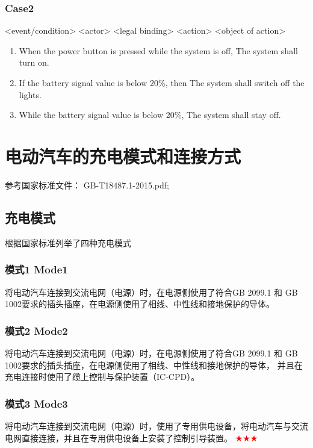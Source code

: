 \subsubsection*{Case2}
	\begin{mybox}
		\centering
		\textcolor{winered}{<event/condition>} \textcolor{mybule}{<actor>} \textcolor{mypurple}{<legal binding>} \textcolor{mygreen1}{<action>} \textcolor{mygreen2}{<object of action>}
	\end{mybox}


	\begin{enumerate}
		\item \textcolor{winered}{When the power button is pressed while the system is off}, \textcolor{mybule}{The system} \textcolor{mypurple}{shall} \textcolor{mygreen1}{turn on}.
		\item \textcolor{winered}{If the battery signal value is below 20\%}, then \textcolor{mybule}{The system} \textcolor{mypurple}{shall}  \textcolor{mygreen1}{switch off} \textcolor{mygreen2}{the lights}.
		\item \textcolor{winered}{While the battery signal value is below 20\%}, \textcolor{mybule}{The system} \textcolor{mypurple}{shall} \textcolor{mygreen1}{stay off}.
	\end{enumerate}


\section{电动汽车的充电模式和连接方式}
	参考国家标准文件： GB-T18487.1-2015.pdf\cite{GB18487};
	\subsection{充电模式}
		根据国家标准列举了四种充电模式
		\subsubsection*{模式1 Mode1}
			将电动汽车连接到交流电网（电源）时，在电源侧使用了符合GB 2099.1 和 GB 1002要求的插头插座，在电源侧使用了相线、中性线和接地保护的导体。
		\subsubsection*{模式2 Mode2}
			将电动汽车连接到交流电网（电源）时，在电源侧使用了符合GB 2099.1 和 GB 1002要求的插头插座，在电源侧使用了相线、中性线和接地保护的导体，
			并且在充电连接时使用了缆上控制与保护装置（IC-CPD）。
		\subsubsection*{模式3 Mode3}
			将电动汽车连接到交流电网（电源）时，使用了专用供电设备，将电动汽车与交流电网直接连接，并且在专用供电设备上安装了控制引导装置。 \textcolor{red}{$\bigstar  \bigstar \bigstar $}
